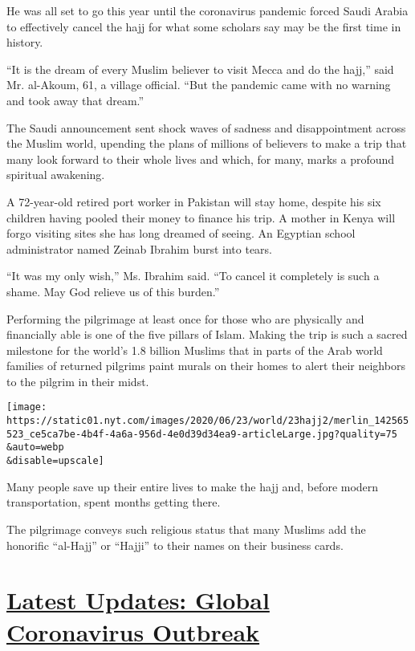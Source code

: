 He was all set to go this year until the coronavirus pandemic forced
Saudi Arabia to effectively cancel the hajj for what some scholars say
may be the first time in history.

``It is the dream of every Muslim believer to visit Mecca and do the
hajj,'' said Mr. al-Akoum, 61, a village official. ``But the pandemic
came with no warning and took away that dream.''

The Saudi announcement sent shock waves of sadness and disappointment
across the Muslim world, upending the plans of millions of believers to
make a trip that many look forward to their whole lives and which, for
many, marks a profound spiritual awakening.

A 72-year-old retired port worker in Pakistan will stay home, despite
his six children having pooled their money to finance his trip. A mother
in Kenya will forgo visiting sites she has long dreamed of seeing. An
Egyptian school administrator named Zeinab Ibrahim burst into tears.

``It was my only wish,'' Ms. Ibrahim said. ``To cancel it completely is
such a shame. May God relieve us of this burden.''

Performing the pilgrimage at least once for those who are physically and
financially able is one of the five pillars of Islam. Making the trip is
such a sacred milestone for the world's 1.8 billion Muslims that in
parts of the Arab world families of returned pilgrims paint murals on
their homes to alert their neighbors to the pilgrim in their midst.

\texttt{[image: https://static01.nyt.com/images/2020/06/23/world/23hajj2/merlin\_142565523\_ce5ca7be-4b4f-4a6a-956d-4e0d39d34ea9-articleLarge.jpg?quality=75\\\&auto=webp\\\&disable=upscale]}

Many people save up their entire lives to make the hajj and, before
modern transportation, spent months getting there.

The pilgrimage conveys such religious status that many Muslims add the
honorific ``al-Hajj'' or ``Hajji'' to their names on their business
cards.

\hypertarget{latest-updates-global-coronavirus-outbreak}{%
\section{\texorpdfstring{\href{https://www.nytimes.com/2020/08/04/world/coronavirus-cases.html?action=click\&pgtype=Article\&state=default\&region=MAIN_CONTENT_1\&context=storylines_live_updates}{Latest
Updates: Global Coronavirus
Outbreak}}{Latest Updates: Global Coronavirus Outbreak}}\label{latest-updates-global-coronavirus-outbreak}}

